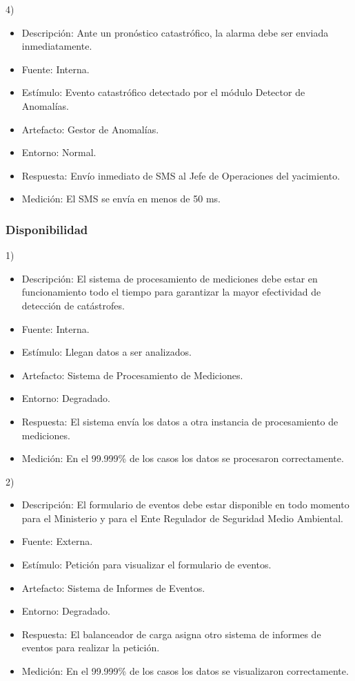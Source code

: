 \documentclass{article}
\theoremstyle{definition}
\theoremstyle{remark}
\begin{document}
\pagebreak

4)
\begin{itemize}
  \item Descripción: Ante un pronóstico catastrófico, la alarma debe ser enviada inmediatamente.
  \item Fuente: Interna.
  \item Estímulo: Evento catastrófico detectado por el módulo Detector de Anomalías.
  \item Artefacto: Gestor de Anomalías.
  \item Entorno: Normal.
  \item Respuesta: Envío inmediato de SMS al Jefe de Operaciones del yacimiento.
  \item Medición: El SMS se envía en menos de 50 ms.
\end{itemize}

\subsubsection{Disponibilidad}

1)
\begin{itemize}
  \item Descripción: El sistema de procesamiento de mediciones debe estar en funcionamiento todo el tiempo para garantizar la mayor efectividad de detección de catástrofes.
  \item Fuente: Interna.
  \item Estímulo: Llegan datos a ser analizados.
  \item Artefacto: Sistema de Procesamiento de Mediciones.
  \item Entorno: Degradado.
  \item Respuesta: El sistema envía los datos a otra instancia de procesamiento de mediciones.
  \item Medición: En el 99.999\% de los casos los datos se procesaron correctamente.
\end{itemize}

2)
\begin{itemize}
  \item Descripción: El formulario de eventos debe estar disponible en todo momento para el Ministerio y para el Ente Regulador de Seguridad Medio Ambiental.
  \item Fuente: Externa.
  \item Estímulo: Petición para visualizar el formulario de eventos.
  \item Artefacto: Sistema de Informes de Eventos.
  \item Entorno: Degradado.
  \item Respuesta: El balanceador de carga asigna otro sistema de informes de eventos para realizar la petición.
  \item Medición: En el 99.999\% de los casos los datos se visualizaron correctamente.
\end{itemize}
\end{document}

